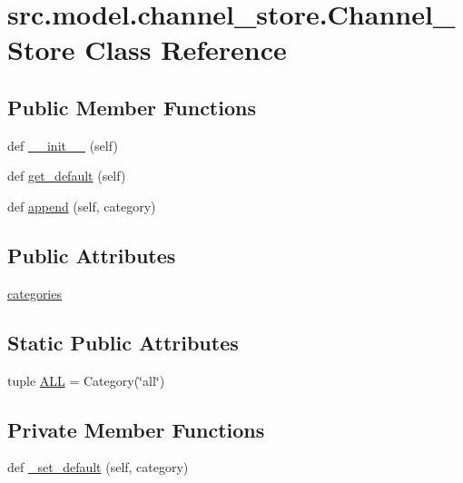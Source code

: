 \hypertarget{classsrc_1_1model_1_1channel__store_1_1Channel__Store}{}\section{src.\+model.\+channel\+\_\+store.\+Channel\+\_\+\+Store Class Reference}
\label{classsrc_1_1model_1_1channel__store_1_1Channel__Store}
\subsection*{Public Member Functions}
\begin{DoxyCompactItemize}
\item 
def \hyperlink{classsrc_1_1model_1_1channel__store_1_1Channel__Store_adf1bcb70446bc48f0a6c7682666f3af7}{\+\_\+\+\_\+init\+\_\+\+\_\+} (self)
\item 
def \hyperlink{classsrc_1_1model_1_1channel__store_1_1Channel__Store_ab2cc111eceef9eb386ef89fec578e301}{get\+\_\+default} (self)
\item 
def \hyperlink{classsrc_1_1model_1_1channel__store_1_1Channel__Store_a83eb2469b676af82ffefcc30ab53e0a9}{append} (self, category)
\end{DoxyCompactItemize}
\subsection*{Public Attributes}
\begin{DoxyCompactItemize}
\item 
\hyperlink{classsrc_1_1model_1_1channel__store_1_1Channel__Store_a9e2372569f733406cb55b8c2610b0bf3}{categories}
\end{DoxyCompactItemize}
\subsection*{Static Public Attributes}
\begin{DoxyCompactItemize}
\item 
tuple \hyperlink{classsrc_1_1model_1_1channel__store_1_1Channel__Store_a3a896181a843b1c9be26a2d09d2af9c8}{A\+L\+L} = Category(\char`\"{}all\char`\"{})
\end{DoxyCompactItemize}
\subsection*{Private Member Functions}
\begin{DoxyCompactItemize}
\item 
def \hyperlink{classsrc_1_1model_1_1channel__store_1_1Channel__Store_af7273eaa7833915fe6dfac3d6f7c7222}{\+\_\+set\+\_\+default} (self, category)
\end{DoxyCompactItemize}


